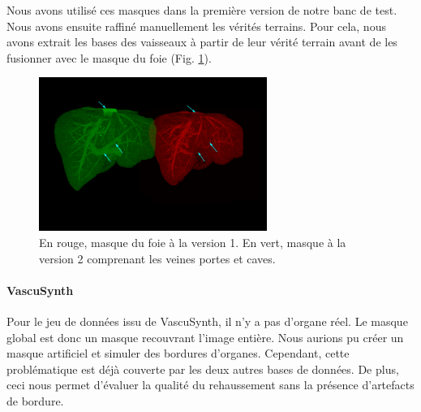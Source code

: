 Nous avons utilisé ces masques dans la première version de notre banc de test. Nous avons ensuite raffiné manuellement les vérités terrains. Pour cela, nous avons extrait les bases des vaisseaux à partir de leur  vérité terrain avant de les fusionner avec le masque du foie (Fig. \ref{fig:masques_globaux_ircad}).
\begin{figure}[!ht]
  \centering
  \includegraphics[height=5cm]{Images/ircad_corrected_gt.png}
  \caption{En rouge, masque du foie à la version 1. En vert, masque à la version 2 comprenant les veines portes et caves.}
  \label{fig:masques_globaux_ircad}
\end{figure}
\paragraph{VascuSynth}
Pour le jeu de données issu de VascuSynth, il n'y a pas d'organe réel. Le masque global est donc un masque recouvrant l'image entière. Nous aurions pu créer un masque artificiel et simuler des bordures d'organes. Cependant, cette problématique est déjà couverte par les deux autres bases de données. De plus, ceci nous permet d'évaluer la qualité du rehaussement sans la présence d'artefacts de bordure.

